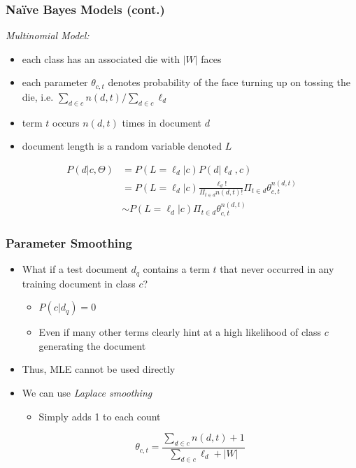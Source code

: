 \documentclass{beamer}
\begin{document}
\begin{frame} \frametitle{Na{\"i}ve Bayes Models (cont.)}

  \emph{Multinomial Model:}  %
  \begin{itemize}
  \item each class has an associated die with $|W|$ faces
  \item each parameter $\theta_{c,t}$ denotes probability of the face turning
    up on tossing the die, i.e. $\sum_{d \in c}n(d,t) / \sum_{d \in c}\ell_d$
  \item term $t$ occurs $n(d,t)$ times in document $d$
  \item document length is a random variable denoted $L$
  \end{itemize}
  \begin{displaymath}
    \begin{split}
          P(d|c,\Theta) & = P(L = \ell_d|c)P(d|\ell_d,c) \\
                  & = P(L = \ell_d|c)
                      \frac{\ell_d!}{\Pi_{t \in d}n(d,t)!}
                      \Pi_{t \in d}\theta_{c,t}^{n(d,t)} \\
                 & \sim P(L = \ell_d|c)
                     \Pi_{t \in d}\theta_{c,t}^{n(d,t)}
    \end{split}
   \end{displaymath}

\end{frame}


\begin{frame} \frametitle{Parameter Smoothing}
  
  \begin{itemize}
  \item What if a test document $d_q$ contains a term $t$ that never occurred
      in any training document in class $c$?
      \pause
    \begin{itemize}
    \item $P(c|d_q) = 0$
    \item Even if many other terms clearly hint at a high likelihood of class
      $c$ generating the document
    \end{itemize}
  \item Thus, MLE cannot be used directly
  \item We can use \emph{Laplace smoothing}
    \begin{itemize}
    \item Simply adds 1 to each count
    \end{itemize}
    \begin{displaymath}
        \theta_{c,t} = \frac{\sum_{d \in c}n(d,t) + 1}{\sum_{d \in c}\ell_d + |W|}
    \end{displaymath}
  \end{itemize}

\end{frame}
\end{document}
